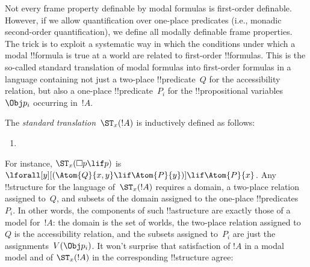 \documentclass[../../../include/open-logic-section]{subfiles}
\begin{document}


Not every frame property definable by modal formulas is first-order
definable. However, if we allow quantification over one-place
predicates (i.e., monadic second-order quantification), we define all
modally definable frame properties. The trick is to exploit a
systematic way in which the conditions under which a modal !!{formula}
is true at a world are related to first-order !!{formula}s. This is
the so-called standard translation of modal formulas into first-order
formulas in a language containing not just a two-place
!!{predicate}~$Q$ for the accessibility relation, but also a one-place
!!{predicate}~$P_i$ for the !!{propositional variable}s~$\Obj p_i$
occurring in~$!A$.

\begin{defn}
  The \emph{standard translation}~$\ST_x(!A)$ is inductively defined
  as follows:
  \begin{enumerate}
  \item {}
  \end{enumerate}
\end{defn}

For instance, $\ST_x(\Box p \lif p)$ is $\lforall[y][(\Atom{Q}{x,y}
  \lif \Atom{P}{y})] \lif \Atom{P}{x}$. Any !!{structure} for the
language of~$\ST_x(!A)$ requires a domain, a two-place relation
assigned to~$Q$, and subsets of the domain assigned to the one-place
!!{predicate}s~$P_i$. In other words, the components of such
!!a{structure} are exactly those of a model for~$!A$: the domain is
the set of worlds, the two-place relation assigned to~$Q$ is the
accessibility relation, and the subsets assigned to~$P_i$ are just the
assignments~$V(\Obj p_i)$. It won't surprise that satisfaction of $!A$
in a modal model and of $\ST_x(!A)$ in the corresponding !!{structure}
agree:
\end{document}
